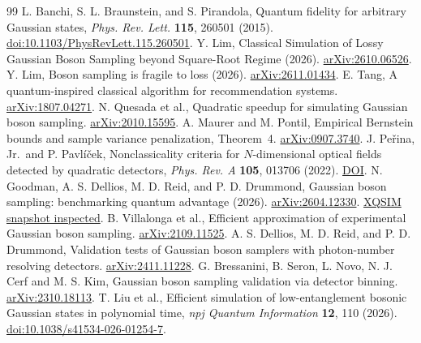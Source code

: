\documentclass[11pt]{article}
\begin{document}
\begin{thebibliography}{99}
 L. Banchi, S. L. Braunstein, and S. Pirandola, Quantum fidelity for arbitrary Gaussian states, \emph{Phys. Rev. Lett.} \textbf{115}, 260501 (2015). \href{https://doi.org/10.1103/PhysRevLett.115.260501}{doi:10.1103/PhysRevLett.115.260501}.
 Y. Lim, Classical Simulation of Lossy Gaussian Boson Sampling beyond Square-Root Regime (2026). \href{https://arxiv.org/abs/2610.06526}{arXiv:2610.06526}.
 Y. Lim, Boson sampling is fragile to loss (2026). \href{https://arxiv.org/abs/2611.01434}{arXiv:2611.01434}.
 E. Tang, A quantum-inspired classical algorithm for recommendation systems. \href{https://arxiv.org/abs/1807.04271}{arXiv:1807.04271}.
 N. Quesada et al., Quadratic speedup for simulating Gaussian boson sampling. \href{https://arxiv.org/abs/2010.15595}{arXiv:2010.15595}.
 A. Maurer and M. Pontil, Empirical Bernstein bounds and sample variance penalization, Theorem~4. \href{https://arxiv.org/abs/0907.3740}{arXiv:0907.3740}.
 J. Pe\v{r}ina, Jr.\ and P. Pavl\'i\v{c}ek, Nonclassicality criteria for $N$-dimensional optical fields detected by quadratic detectors, \emph{Phys. Rev. A} \textbf{105}, 013706 (2022). \href{https://doi.org/10.1103/PhysRevA.105.013706}{DOI}.
 N. Goodman, A. S. Dellios, M. D. Reid, and P. D. Drummond, Gaussian boson sampling: benchmarking quantum advantage (2026). \href{https://arxiv.org/abs/2604.12330}{arXiv:2604.12330}. \href{https://github.com/peterddrummond/xqsim/tree/32609f3644ae18bff872b53a32a3a7f58f883b3b}{XQSIM snapshot inspected}.
 B. Villalonga et al., Efficient approximation of experimental Gaussian boson sampling. \href{https://arxiv.org/abs/2109.11525}{arXiv:2109.11525}.
 A. S. Dellios, M. D. Reid, and P. D. Drummond, Validation tests of Gaussian boson samplers with photon-number resolving detectors. \href{https://arxiv.org/abs/2411.11228}{arXiv:2411.11228}.
 G. Bressanini, B. Seron, L. Novo, N. J. Cerf and M. S. Kim, Gaussian boson sampling validation via detector binning. \href{https://arxiv.org/abs/2310.18113}{arXiv:2310.18113}.
 T. Liu et al., Efficient simulation of low-entanglement bosonic Gaussian states in polynomial time, \emph{npj Quantum Information} \textbf{12}, 110 (2026). \href{https://doi.org/10.1038/s41534-026-01254-7}{doi:10.1038/s41534-026-01254-7}.
\end{thebibliography}
\clearpage
\appendix
\end{document}
